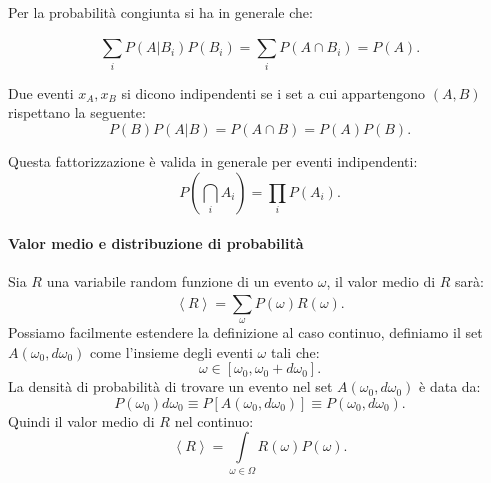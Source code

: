 Per la probabilità congiunta si ha in generale che:
\begin{greenbox}{}
	\[
    		\sum_{i}^{} P\left(A|B_i\right)P(B_i) = \sum_{i}^{} P\left(A \cap B_i\right) = P(A) 
	.\]    
\end{greenbox}
\begin{defn}
 Due eventi $x_A, x_B$ si dicono indipendenti se i set a cui appartengono $(A, B)$ rispettano la seguente:
\[
    P(B) P(A|B) = P(A\cap B) = P(A) P(B) 
.\]    
\end{defn}
\noindent
Questa fattorizzazione è valida in generale per eventi indipendenti:
\[
    P\left(\bigcap_i A_i\right) = \prod_i P(A_i) 
.\]    
\paragraph{Valor medio e distribuzione di probabilità}%
\label{par:Valor medio e distribuzione di probabilità}
Sia $R$ una variabile random funzione di un evento $\omega$, il valor medio di $R$ sarà:
 \[
    \left<R\right> = \sum_{\omega}^{} P(\omega) R(\omega) 
.\]    
Possiamo facilmente estendere la definizione al caso continuo, definiamo il set $A(\omega_0, d\omega_0)$ come l'insieme degli eventi $\omega$ tali che:
\[
    \omega  \in \left[\omega_0, \omega_0 + d\omega_0\right]
.\] 
La densità di probabilità di trovare un evento nel set $A(\omega_0, d\omega_0)$ è data da:
\[
    P(\omega_0) d\omega_0 \equiv P\left[A(\omega_0,d\omega_0) \right] \equiv P(\omega_0,d\omega_0) 
.\] 
Quindi il valor medio di $R$ nel continuo:
 \[
    \left<R\right> = \int\limits_{\omega\in \Omega} R(\omega) P(\omega) 
.\]    

